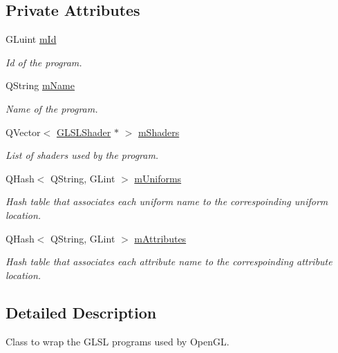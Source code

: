 \subsection*{Private Attributes}
\begin{DoxyCompactItemize}
\item 
G\+Luint \hyperlink{class_g_l_s_l_program_aa42c740f7c6436e49400334f06dd089a}{m\+Id}
\begin{DoxyCompactList}\small\item\em Id of the program. \end{DoxyCompactList}\item 
Q\+String \hyperlink{class_g_l_s_l_program_a1d86ce477a8e3730e806596a03f0f482}{m\+Name}
\begin{DoxyCompactList}\small\item\em Name of the program. \end{DoxyCompactList}\item 
Q\+Vector$<$ \hyperlink{class_g_l_s_l_shader}{G\+L\+S\+L\+Shader} $\ast$ $>$ \hyperlink{class_g_l_s_l_program_a62fef2720556c14a2b27cbe6414875c1}{m\+Shaders}
\begin{DoxyCompactList}\small\item\em List of shaders used by the program. \end{DoxyCompactList}\item 
Q\+Hash$<$ Q\+String, G\+Lint $>$ \hyperlink{class_g_l_s_l_program_a3579d46dba1062e274dd91147ea05392}{m\+Uniforms}
\begin{DoxyCompactList}\small\item\em Hash table that associates each uniform name to the correspoinding uniform location. \end{DoxyCompactList}\item 
Q\+Hash$<$ Q\+String, G\+Lint $>$ \hyperlink{class_g_l_s_l_program_a4214f65948d67841bb024840a250b6e6}{m\+Attributes}
\begin{DoxyCompactList}\small\item\em Hash table that associates each attribute name to the correspoinding attribute location. \end{DoxyCompactList}\end{DoxyCompactItemize}


\subsection{Detailed Description}
Class to wrap the G\+L\+S\+L programs used by Open\+G\+L. 


